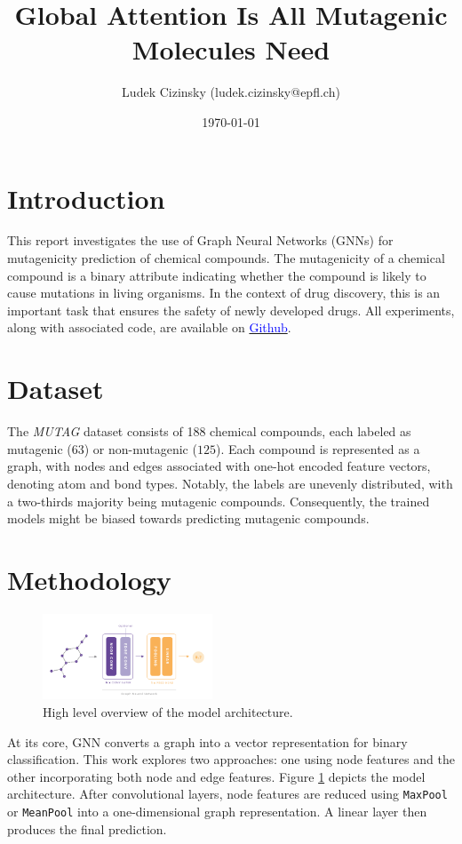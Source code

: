 \documentclass[10pt,twocolumn]{article}
\title{\vspace{-2cm}Global Attention Is All Mutagenic Molecules Need}
\author{Ludek Cizinsky (ludek.cizinsky@epfl.ch)}
\date{\today}
\begin{document}
\maketitle

\section{Introduction}
This report investigates the use of Graph Neural Networks (GNNs) 
for mutagenicity prediction of chemical compounds. 
The mutagenicity of a chemical compound is a binary attribute indicating whether 
the compound is likely to cause mutations in living organisms. In the context of drug discovery,
this is an important task that ensures the safety of newly developed drugs.
All experiments, along with associated code, are available on \href{https://github.com/ludekcizinsky/epfl-cs502/tree/main/coursework/homeworks/hw2}{\textcolor{blue}{Github}}.

\section{Dataset}\label{sec:dataset}
The \textit{MUTAG} dataset \cite{mutag} consists of 188 chemical compounds, each labeled as mutagenic ($63$) or non-mutagenic ($125$). 
Each compound is represented as a graph, with nodes and edges associated with one-hot encoded feature vectors, denoting atom and bond types. 
Notably, the labels are unevenly distributed, with a two-thirds majority being mutagenic compounds. Consequently, the trained models might be biased towards 
predicting mutagenic compounds.

\section{Methodology}\label{sec:methodology}

\begin{figure}[!ht]
    \centering
    \includegraphics[width=0.45\textwidth]{figures/pipeline.png}
    \caption{High level overview of the model architecture.}
    \label{fig:model}
\end{figure}

At its core, GNN converts a graph into a vector representation for binary classification. 
This work explores two approaches: one using node features and the other incorporating both node and edge features. 
Figure \ref{fig:model} depicts the model architecture. After convolutional layers, node features are reduced using \texttt{MaxPool} or \texttt{MeanPool} into a one-dimensional graph representation. 
A linear layer then produces the final prediction.
\end{document}
